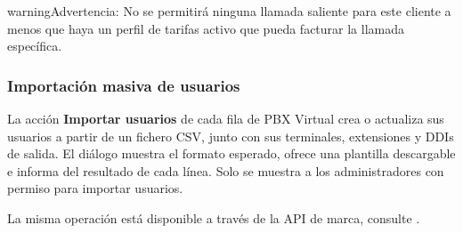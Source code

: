 \documentclass[letterpaper,10pt,spanish]{sphinxmanual}
\begin{document}
\begin{notice}{warning}{Advertencia:}
No se permitirá ninguna llamada saliente para este cliente a menos que haya un perfil de tarifas activo que pueda facturar la llamada específica.
\end{notice}


\subsubsection{Importación masiva de usuarios}
\label{administration_portal/brand/clients/virtual_pbx:id2}\label{administration_portal/brand/clients/virtual_pbx:users-mass-import}
La acción \textbf{Importar usuarios} de cada fila de PBX Virtual crea o actualiza sus usuarios a partir de un fichero CSV, junto con sus terminales, extensiones y DDIs de salida. El diálogo muestra el formato esperado, ofrece una plantilla descargable e informa del resultado de cada línea. Solo se muestra a los administradores con permiso para importar usuarios.

La misma operación está disponible a través de la API de marca, consulte {\hyperref[administration_portal/brand/clients/virtual_pbx:users\string-mass\string-import\string-api]{}}.
\end{document}
